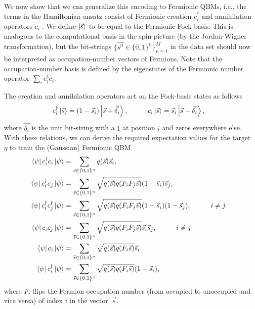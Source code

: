 \documentclass[
    aps,
    prx,
    onecolumn
]{revtex4-2}
\begin{document}
We now show that we can generalize this encoding to Fermionic QBMs, i.e., the terms in the Hamiltonian ansatz consist of Fermionic creation $c_i^\dagger$ and annihilation operators $c_i$ . We define $\ket{\vec{s}}$ to be equal to the Fermionic Fock basis. This is analogous to the computational basis in the spin-picture (by the Jordan-Wigner transformation), but the bit-strings $\{\vec{s^\mu}\in\{0,1\}^n\}_{\mu=1}^M$ in the data set should now be interpreted as occupation-number vectors of Fermions. Note that the occupation-number basis is defined by the eigenstates of the Fermionic number operator $\sum_i c^\dagger_i c_i$. 

The creation and annihilation operators act on the Fock-basis states as follows \begin{equation} 
    c^\dagger_i \ket{\vec{s}} = (1-\vec{s}_i)\ket{\vec{s}+\vec{\delta_i}}, \hspace{1cm} c_i \ket{\vec{s}} = \vec{s}_i\ket{\vec{s}-\vec{\delta_i}},
\end{equation} where $\vec{\delta_i}$ is the unit bit-string with a $1$ at position $i$ and zeros everywhere else. With these relations, we can derive the required expectation values for the target $\eta$ to train the (Gaussian) Fermionic QBM   
\begin{align}
\begin{split}
    \bra{\psi} c^\dagger_i c_i \ket{\psi} &= \sum_{\vec{s}\in\{0,1\}^n}q(\vec{s})\vec{s}_i, \\
    \bra{\psi} c^\dagger_i c_j \ket{\psi} &= \sum_{\vec{s}\in\{0,1\}^n}\sqrt{q(\vec{s})q(F_i F_j\vec{s})}(1-\vec{s}_i)\vec{s}_j,
    \\
    \bra{\psi} c^\dagger_i c^\dagger_j \ket{\psi} &= \sum_{\vec{s}\in\{0,1\}^n}\sqrt{q(\vec{s})q(F_i F_j\vec{s})}(1-\vec{s}_i)(1-\vec{s}_j), \hspace{1cm} i\neq j
    \\
    \bra{\psi} c_i c_j \ket{\psi} &= \sum_{\vec{s}\in\{0,1\}^n}\sqrt{q(\vec{s})q(F_i F_j\vec{s})}\vec{s}_i\vec{s}_j, \hspace{1cm} i\neq j
    \\
    \bra{\psi} c_i\ket{\psi} &= \sum_{\vec{s}\in\{0,1\}^n}\sqrt{q(\vec{s})q(F_i \vec{s})}\vec{s}_i
    \\
    \bra{\psi} c_i^\dagger\ket{\psi} &= \sum_{\vec{s}\in\{0,1\}^n}\sqrt{q(\vec{s})q(F_i \vec{s})}(1-\vec{s}_i),
\end{split}
\end{align} 
where $F_i$ flips the Fermion occupation number (from occupied to unoccupied and vice versa) of index $i$ in the vector~$\vec{s}$. 
\end{document}
